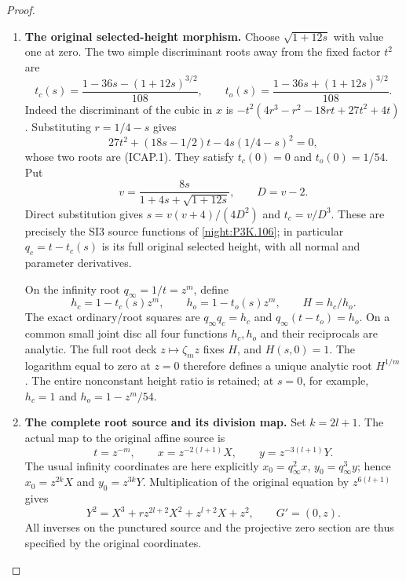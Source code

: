 \begin{proof}
\begin{enumerate}[label=\arabic*.]
\item \textbf{The original selected-height morphism.}
Choose \(\sqrt{1+12s}\) with value one at zero. The two simple
discriminant roots away from the fixed factor \(t^2\) are
\[
 t_c(s)=\frac{1-36s-(1+12s)^{3/2}}{108},\qquad
 t_o(s)=\frac{1-36s+(1+12s)^{3/2}}{108}.
 \tag{ICAP.1}
\]
Indeed the discriminant of the cubic in \(x\) is
\(-t^2(4r^3-r^2-18rt+27t^2+4t)\). Substituting
\(r=1/4-s\) gives
\[
 27t^2+(18s-1/2)t-4s(1/4-s)^2=0,
\]
whose two roots are (ICAP.1). They satisfy \(t_c(0)=0\) and
\(t_o(0)=1/54\). Put
\[
 v=\frac{8s}{1+4s+\sqrt{1+12s}},\qquad D=v-2.
\]
Direct substitution gives
\(s=v(v+4)/(4D^2)\) and \(t_c=v/D^3\). These are precisely
the SI3 source functions of \cref{night:P3K.106}; in particular
\(q_c=t-t_c(s)\) is its full original selected height, with all
normal and parameter derivatives.

On the infinity root \(q_\infty=1/t=z^m\), define
\[
 h_c=1-t_c(s)z^m,\qquad h_o=1-t_o(s)z^m,
 \qquad H=h_c/h_o.                                      \tag{ICAP.2}
\]
The exact ordinary/root squares are
\(q_\infty q_c=h_c\) and \(q_\infty(t-t_o)=h_o\).
On a common small joint disc all four functions \(h_c,h_o\)
and their reciprocals are analytic. The full root deck
\(z\mapsto\zeta_mz\) fixes \(H\), and \(H(s,0)=1\).
The logarithm equal to zero at \(z=0\) therefore defines a
unique analytic root \(H^{1/m}\). The entire nonconstant
height ratio is retained; at \(s=0\), for example,
\(h_c=1\) and \(h_o=1-z^m/54\).

\item \textbf{The complete root source and its division map.}
Set \(k=2l+1\). The actual map to the original affine source is
\[
 t=z^{-m},\qquad x=z^{-2(l+1)}X,\qquad y=z^{-3(l+1)}Y.
 \tag{ICAP.3}
\]
The usual infinity coordinates are here explicitly
\(x_0=q_\infty^2x\), \(y_0=q_\infty^3y\); hence
\(x_0=z^{2k}X\) and \(y_0=z^{3k}Y\). Multiplication of the
original equation by \(z^{6(l+1)}\) gives
\[
 Y^2=X^3+r z^{2l+2}X^2+z^{l+2}X+z^2,
 \qquad G'=(0,z).                                      \tag{ICAP.4}
\]
All inverses on the punctured source and the projective zero
section are thus specified by the original coordinates.


\end{enumerate}
\end{proof}

